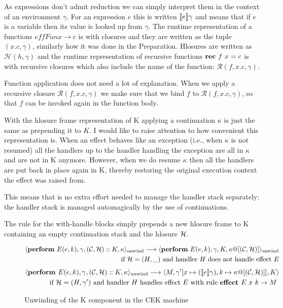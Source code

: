 \documentclass[class=article, crop=false]{standalone}
\begin{document}
As expressions don't admit reduction we can simply interpret them in the context of an environment $\gamma$. For an expression $e$
this is written $\llbracket e \rrbracket\gamma$ and means that if $e$ is a variable then its value is looked up from $\gamma$. The runtime representation
of a functions $effFun x \to c$ is with closures and they are written as the tuple $(x.c, \gamma)$, similarly how it was done in the Preparation. 
Hlosures are written as $\mathcal{H}(h, \gamma)$ and the runtime representation of recursive functions $\mathbf{rec}\  f\ x = c$ is with recursive
closures which also include the name of the function: $\mathcal{R}(f, x.c, \gamma)$.

Function application does not need a lot of explanation. When we apply a recursive closure $\mathcal{R}(f, x.c, \gamma)$ we make sure that we bind
$f$ to $\mathcal{R}(f, x.c, \gamma)$, so that $f$ can be invoked again in the function body. 

With the hlosure frame representation of K applying a continuation $\kappa$ is just the same as prepending it to $K$.
I would like to raise attention to how convenient this representation is. When an effect behaves like an exception (i.e., when $\kappa$ is not resumed)
all the handlers up to the handler handling the exception are all in $\kappa$ and are not in K anymore. However, when we do resume $\kappa$ then all
the handlers are put back in place again in K, thereby restoring the original execution context the effect was raised from.

This means that is no extra effort needed to manage the handler stack separately: the handler stack is managed automagically by the use of continuations.

The rule for the with-handle blocks simply prepends a new hlosure frame to K containing an empty continuation stack and the hlosure $\mathcal{H}$.

\begin{figure}
    \begin{align*}
        \cek{ \effPerform E(e,k), \gamma, (\konts, \hlosure) :: K, \kappa}_\text{unwind} \longrightarrow
        \cek{ \effPerform E(e,k), \gamma, K, \kappa@[(\konts, \hlosure)] }_\text{unwind} \\
        \text{ if $\hlosure = (H, \_)$ and handler $H$ does not handle effect $E$}
        \end{align*}
        \begin{align*}
        \langle  \textbf{perform } E(e,k), \gamma, (\mathcal{C}, \mathcal{H}) :: K, \kappa \rangle_\text{unwind} \longrightarrow
        \langle  M, \gamma' [x \mapsto (\llbracket e \rrbracket\gamma), k \mapsto \kappa @ [(\mathcal{C}, \mathcal{H})]], K \rangle \\
        \text{ if $\mathcal{H} = (H, \gamma')$ and handler $H$ handles effect $E$ with rule $\textbf{effect } E\ x \ k \to M$ }
        \end{align*}
    \caption{Unwinding of the K component in the CEK machine}
    \label{cek-k-unwind}
\end{figure}
\end{document}
